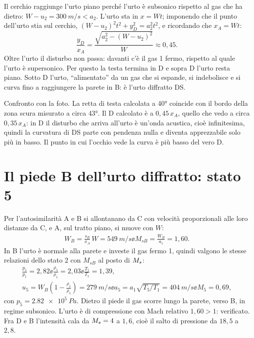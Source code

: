 Il cerchio raggiunge l'urto piano perché l'urto è subsonico rispetto al gas che ha dietro: $W-u_2=\SI{300}{m/s}<a_2$.
L'urto sta in $x=Wt$; imponendo che il punto dell'urto stia sul cerchio, $(W-u_2)^2t^2+y_D^2=a_2^2t^2$, e
ricordando che $x_A=Wt$:
\[
\frac{y_D}{x_A}=\frac{\sqrt{a_2^2-(W-u_2)^2}}{W}\approx0{,}45 .
\]
Oltre l'urto il disturbo non passa: davanti c'è il gas 1 fermo, rispetto al quale l'urto è supersonico. Per questo la
testa termina in D e sopra D l'urto resta piano. Sotto D l'urto, ``alimentato'' da un gas che si espande, si indebolisce
e si curva fino a raggiungere la parete in B: è l'urto diffratto DS.


Confronto con la foto. La retta di testa calcolata a \ang{40} coincide con il bordo della zona scura misurato a circa
\ang{43}. Il D calcolato è a $0{,}45\,x_A$, quello che vedo a circa $0{,}35\,x_A$: in D il disturbo che arriva all'urto
è un'onda acustica, cioè infinitesima, quindi la curvatura di DS parte con pendenza nulla e diventa apprezzabile solo
più in basso. Il punto in cui l'occhio vede la curva è più basso del vero D.

\section*{Il piede B dell'urto diffratto: stato 5}
Per l'autosimilarità A e B si allontanano da C con velocità proporzionali alle loro distanze da C, e A, sul tratto
piano, si muove con $W$:
\begin{gather*}
W_B=\frac{s_B}{x_A}\,W=\SI{549}{m/s} \ee M_{sB}=\frac{W_B}{a_1}=1{,}60 .
\end{gather*}
In B l'urto è normale alla parete e investe il gas fermo 1, quindi valgono le stesse relazioni dello stato 2 con
$M_{sB}$ al posto di $M_{s}$:
\begin{gather*}
\frac{p_5}{p_1}=2{,}82 \ee \frac{\rho_5}{\rho_1}=2{,}03 \ee \frac{T_5}{T_1}=1{,}39,\\
u_5=W_B\left(1-\frac{\rho_1}{\rho_5}\right)=\SI{279}{m/s} \ee a_5=a_1\sqrt{T_5/T_1}=\SI{404}{m/s} \ee
M_5=0{,}69,
\end{gather*}
con $p_5=\SI{2.82e5}{Pa}$. Dietro il piede il gas scorre lungo la parete, verso B, in regime subsonico.
L'urto è di compressione con Mach relativo $1{,}60>1$: verificato. Fra D e B l'intensità cala da $M_{s}=4$ a $1{,}6$, cioè
il salto di pressione da $18{,}5$ a $2{,}8$.

